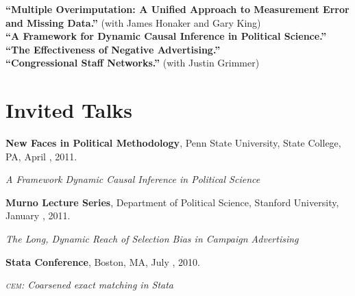 \documentclass[margin,line]{res}
\newenvironment{list1}{
  \begin{list}{\ding{113}}{%
      \setlength{\itemsep}{0in}
      \setlength{\parsep}{0in} \setlength{\parskip}{0in}
      \setlength{\topsep}{0in} \setlength{\partopsep}{0in} 
      \setlength{\leftmargin}{0.17in}}}{\end{list}}
\begin{document}
\begin{resume}
{\bf ``Multiple Overimputation: A Unified Approach to Measurement Error and
Missing Data.''} (with James Honaker and Gary King) \vspace{1em}\\
{\bf ``A Framework for Dynamic Causal Inference in Political Science.''}\vspace{1em}\\
{\bf ``The Effectiveness of Negative Advertising.'' }\vspace{1em}\\
{\bf ``Congressional Staff Networks.''} (with Justin Grimmer) 


\section{\textsf{\sc Invited Talks}}
{\bf New Faces in Political Methodology}, Penn State University, State College, PA, April , 2011. 
\begin{list1} 
\item[] \emph{A Framework Dynamic Causal Inference in Political Science}
\end{list1} \vspace{-0em}
{\bf Murno Lecture Series}, Department of Political Science, Stanford University, January  , 2011. 
\begin{list1} 
\item[] \emph{The Long, Dynamic Reach of Selection Bias in Campaign Advertising}
\end{list1} \vspace{-0em}
{\bf Stata Conference}, Boston, MA, July , 2010.
\begin{list1}
\item[] \emph{\textsc{cem}: Coarsened exact matching in Stata}
\end{list1}\vspace{-.5em}

\end{resume}
\end{document}
